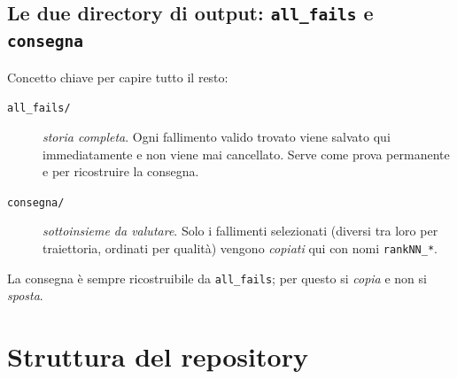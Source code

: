 \documentclass[11pt,a4paper]{report}
\newcommand{\code}[1]{\texttt{#1}}
\begin{document}
\section{Le due directory di output: \texttt{all\_fails} e \texttt{consegna}}
Concetto chiave per capire tutto il resto:
\begin{description}
  \item[\code{all\_fails/}] \emph{storia completa}. Ogni fallimento
    valido trovato viene salvato qui immediatamente e non viene mai
    cancellato. Serve come prova permanente e per ricostruire la
    consegna.
  \item[\code{consegna/}] \emph{sottoinsieme da valutare}. Solo i
    fallimenti selezionati (diversi tra loro per traiettoria, ordinati
    per qualità) vengono \emph{copiati} qui con nomi \code{rankNN\_*}.
\end{description}
La consegna è sempre ricostruibile da \code{all\_fails}; per questo si
\emph{copia} e non si \emph{sposta}.

\chapter{Struttura del repository}
\end{document}
